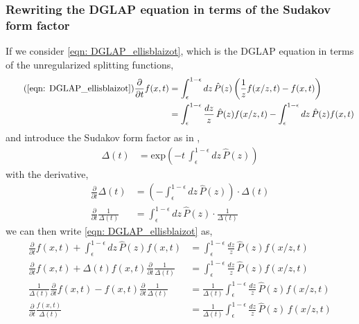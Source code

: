 \documentclass[main.tex]{subfiles}
\begin{document}
\subsubsection{Rewriting the DGLAP equation in terms of the Sudakov form factor}
If we consider \autoref{eqn: DGLAP_ellisblaizot}, which is the DGLAP equation in terms of the unregularized splitting functions, %
\begin{align}\tag{\ref{eqn: DGLAP_ellisblaizot}}
    \frac{\partial}{\partial t} f(x,t) &= \int_{\epsilon}^{1-\epsilon} dz \, \hat{P}(z) \left( \frac{1}{z} f(x/z ,t) - f(x,t) \right) \nonumber \\
    &= \int_{\epsilon}^{1-\epsilon} \frac{dz}{z} \, \hat{P}(z) f(x/z ,t) - \int_{\epsilon}^{1-\epsilon} dz \, \hat{P}(z) f(x,t)
\end{align}
and introduce the Sudakov form factor as in \cite{Dasgupta_2015},
\begin{align}\label{eqn: sudakov_form_factor_dasguptalike}
    \Delta (t) &= \text{exp}\left(-t\, \int_{\epsilon}^{1-\epsilon}dz \, \hat P(z)\right) 
\end{align}
with the derivative,
\begin{align}
    \frac{\partial}{\partial t} \Delta (t) &= (- \int_{\epsilon}^{1-\epsilon} dz\, \hat P(z) )\cdot  \Delta(t) \nonumber\\
    \frac{\partial}{\partial t} \frac{1}{\Delta(t)}&= \int_{\epsilon}^{1-\epsilon} dz\, \hat P(z) \cdot  \frac{1}{\Delta(t)}
\end{align}
we can then write \autoref{eqn: DGLAP_ellisblaizot} as, 
\begin{align}\label{eqn: DGLAP_evolutioneq_unregularized_differential_ellis}
    \frac{\partial}{\partial t} f(x,t) + \int_{\epsilon}^{1-\epsilon} dz \, \hat{P}(z) f(x,t) &= \int_{\epsilon}^{1-\epsilon} \frac{dz}{z} \, \hat{P}(z) f(x/z ,t) \nonumber \\
    \frac{\partial}{\partial t} f(x,t) + \Delta(t) f(x,t) \frac{\partial}{\partial t} \frac{1}{\Delta(t)} &= \int_{\epsilon}^{1-\epsilon} \frac{dz}{z} \, \hat{P}(z) f(x/z ,t) \nonumber \\
    \frac{1}{\Delta(t)} \frac{\partial}{\partial t} f(x,t) - f(x,t) \frac{\partial}{\partial t} \frac{1}{\Delta(t)} &= \frac{1}{\Delta(t)} \int_{\epsilon}^{1-\epsilon} \frac{dz}{z} \, \hat{P}(z) f(x/z ,t) \nonumber \\
    \frac{\partial }{\partial t} \frac{f(x,t)}{\Delta (t)} &= \frac{1}{\Delta(t)} \int_{\epsilon}^{1-\epsilon} \frac{dz}{z} \, \hat P(z) \, f(x/z, t)
\end{align}
\end{document}
